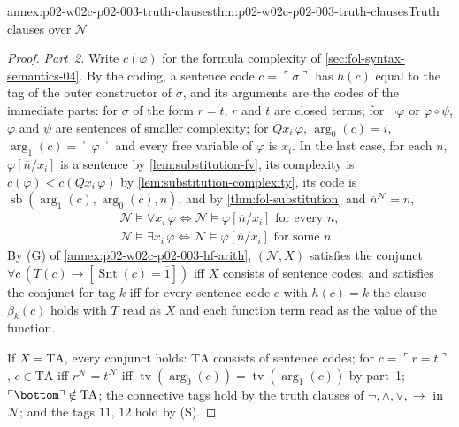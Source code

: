 \begin{annexitem}{annex:p02-w02c-p02-003-truth-clauses}{thm:p02-w02c-p02-003-truth-clauses}{Truth clauses over \(\mathcal N\)}
\begin{proof}
\emph{Part~2.}  Write \(c(\varphi)\) for the formula complexity of
\cref{sec:fol-syntax-semantics-04}.  By the coding, a sentence code
\(c=\ulcorner\sigma\urcorner\) has \(h(c)\) equal to the tag of the outer
constructor of \(\sigma\), and its arguments are the codes of the
immediate parts: for \(\sigma\) of the form \(r=t\), \(r\) and \(t\) are
closed terms; for \(\neg\varphi\) or \(\varphi\circ\psi\), \(\varphi\) and
\(\psi\) are sentences of smaller complexity; for \(Qx_i\,\varphi\),
\(\operatorname{arg}_0(c)=i\), \(\operatorname{arg}_1(c)=\ulcorner\varphi\urcorner\)
and every free variable of \(\varphi\) is \(x_i\).  In the last case, for
each \(n\), \(\varphi[\overline n/x_i]\) is a sentence by
\cref{lem:substitution-fv}, its complexity is \(c(\varphi)<c(Qx_i\,\varphi)\)
by \cref{lem:substitution-complexity}, its code is
\(\operatorname{sb}(\operatorname{arg}_1(c),\operatorname{arg}_0(c),n)\), and
by \cref{thm:fol-substitution} and \(\overline n^{\mathcal N}=n\),
\begin{equation*}
\begin{gathered}
 \mathcal N\models\forall x_i\,\varphi\iff
 \mathcal N\models\varphi[\overline n/x_i]\text{ for every }n,\\
 \mathcal N\models\exists x_i\,\varphi\iff
 \mathcal N\models\varphi[\overline n/x_i]\text{ for some }n.
\end{gathered}
\tag{S}
\end{equation*}
By (G) of \cref{annex:p02-w02c-p02-003-hf-arith}, \((\mathcal N,X)\) satisfies
the conjunct \(\forall c\,(T(c)\to[\operatorname{Snt}(c)=\overline1])\) iff
\(X\) consists of sentence codes, and satisfies the conjunct for tag \(k\)
iff for every sentence code \(c\) with \(h(c)=k\) the clause
\(\beta_k(c)\) holds with \(T\) read as \(X\) and each function term read as
the value of the function.

If \(X=\mathrm{TA}\), every conjunct holds: \(\mathrm{TA}\) consists of
sentence codes; for \(c=\ulcorner r=t\urcorner\), \(c\in\mathrm{TA}\) iff
\(r^{\mathcal N}=t^{\mathcal N}\) iff
\(\operatorname{tv}(\operatorname{arg}_0(c))=\operatorname{tv}(\operatorname{arg}_1(c))\)
by part~1; \(\ulcorner\bottom\urcorner\notin\mathrm{TA}\); the connective
tags hold by the truth clauses of \(\neg,\land,\lor,\to\) in
\(\mathcal N\); and the tags \(11\), \(12\) hold by (S).


\end{proof}
\end{annexitem}
